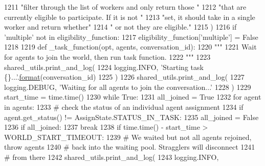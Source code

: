 \begin{DoxyCode}
1211                     \textcolor{stringliteral}{"filter through the list of workers and only return those "}
1212                     \textcolor{stringliteral}{"that are currently eligible to participate. If it is not "}
1213                     \textcolor{stringliteral}{"set, it should take in a single worker and return whether"}
1214                     \textcolor{stringliteral}{" or not they are eligible."}
1215                 )
1216             \textcolor{keywordflow}{if} \textcolor{stringliteral}{'multiple'} \textcolor{keywordflow}{not} \textcolor{keywordflow}{in} eligibility\_function:
1217                 eligibility\_function[\textcolor{stringliteral}{'multiple'}] = \textcolor{keyword}{False}
1218 
1219         \textcolor{keyword}{def }\_task\_function(opt, agents, conversation\_id):
1220             \textcolor{stringliteral}{"""}
1221 \textcolor{stringliteral}{            Wait for agents to join the world, then run task function.}
1222 \textcolor{stringliteral}{            """}
1223             shared\_utils.print\_and\_log(
1224                 logging.INFO, \textcolor{stringliteral}{'Starting task \{\}...'}.\hyperlink{namespaceparlai_1_1chat__service_1_1services_1_1messenger_1_1shared__utils_a32e2e2022b824fbaf80c747160b52a76}{format}(conversation\_id)
1225             )
1226             shared\_utils.print\_and\_log(
1227                 logging.DEBUG, \textcolor{stringliteral}{'Waiting for all agents to join the conversation...'}
1228             )
1229             start\_time = time.time()
1230             \textcolor{keywordflow}{while} \textcolor{keyword}{True}:
1231                 all\_joined = \textcolor{keyword}{True}
1232                 \textcolor{keywordflow}{for} agent \textcolor{keywordflow}{in} agents:
1233                     \textcolor{comment}{# check the status of an individual agent assignment}
1234                     \textcolor{keywordflow}{if} agent.get\_status() != AssignState.STATUS\_IN\_TASK:
1235                         all\_joined = \textcolor{keyword}{False}
1236                 \textcolor{keywordflow}{if} all\_joined:
1237                     \textcolor{keywordflow}{break}
1238                 \textcolor{keywordflow}{if} time.time() - start\_time > WORLD\_START\_TIMEOUT:
1239                     \textcolor{comment}{# We waited but not all agents rejoined, throw agents}
1240                     \textcolor{comment}{# back into the waiting pool. Stragglers will disconnect}
1241                     \textcolor{comment}{# from there}
1242                     shared\_utils.print\_and\_log(
1243                         logging.INFO,

\end{DoxyCode}
